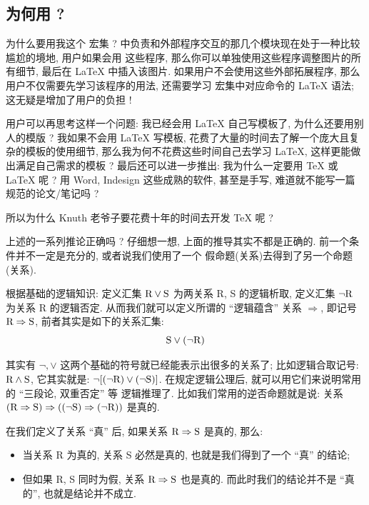 \documentclass[
  hyper, lang=cn,
  classOption = {11pt},
  mathSpec={envStyle=leftbar},
]{../../zlatex/code/ztex}
\def\lrr#1{\ensuremath{\Rightarrow}}
\begin{document}
\subsection{为何用 \texorpdfstring{\ztex}{zTeX}?}
为什么要用我这个 \ztex{} 宏集 ? \zTikZ{} 中负责和外部程序交互的那几个模块现在处于一种比较尴尬的境地, 用户如果会用
这些程序, 那么你可以单独使用这些程序调整图片的所有细节, 最后在 \LaTeX{} 中插入该图片. 如果用户不会使用这些外部拓展程序,
那么用户不仅需要先学习该程序的用法, 还需要学习 \zTikZ{} 宏集中对应命令的 \LaTeX{} 语法; 这无疑是增加了用户的负担 !

用户可以再思考这样一个问题: 我已经会用 \LaTeX{} 自己写模板了, 为什么还要用别人的模版 ? 我如果不会用 \LaTeX{} 写模板,
花费了大量的时间去了解一个庞大且复杂的模板的使用细节, 那么我为何不花费这些时间自己去学习 \LaTeX{}, 这样更能做出满足自己需求的模板 ? 
最后还可以进一步推出: 我为什么一定要用 \TeX{} 或 \LaTeX{} 呢 ? 用 Word, Indesign 这些成熟的软件, 甚至是手写, 难道就不能写一篇
规范的论文/笔记吗 ? 

所以为什么 Knuth 老爷子要花费十年的时间去开发 \TeX{} 呢 ? 

上述的一系列推论正确吗 ? 仔细想一想, 上面的推导其实不都是正确的. 前一个条件并不一定是充分的, 或者说我们使用了一个
假命题(关系)去得到了另一个命题(关系). 

根据基础的逻辑知识: 定义汇集 $\text R \vee \text S$ 为两关系 R, S 的逻辑析取, 定义汇集 $\lnot \text R$ 为关系 R 的逻辑否定. 
从而我们就可以定义所谓的 ``逻辑蕴含'' 关系 $\lrr{}$, 即记号 $\text R\lrr{} \text S$, 前者其实是如下的关系汇集:
\[
  \text S \vee (\lnot \text R)
\]

\begin{remark}
其实有 $\lnot, \vee$ 这两个基础的符号就已经能表示出很多的关系了; 比如逻辑合取记号: $\text R\wedge \text S$, 它其实就是:
$ \lnot [(\lnot \text R)\vee (\lnot \text S)]$. 在规定逻辑公理后, 就可以用它们来说明常用的 ``三段论, 双重否定'' 等
逻辑推理了. 比如我们常用的逆否命题就是说: 关系 $(\text R\lrr{}\text S) \lrr{} ((\lnot\text S)\lrr{}(\lnot\text R))$
是真的.
\end{remark}

在我们定义了关系 ``真'' 后, 如果关系 $\text R\lrr{}\text S$ 是真的, 那么:
\begin{itemize}
  \item 当关系 R 为真的, 关系 S 必然是真的, 也就是我们得到了一个 ``真'' 的结论;
  \item 但如果 R, S 同时为假, 关系 $\text R\lrr{}\text S$ 也是真的. 而此时我们的结论并不是 ``真的'', 
    也就是结论并不成立.
\end{itemize}
\end{document}
